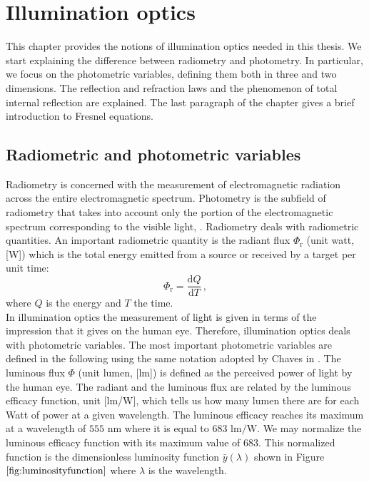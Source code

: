 \chapter{Illumination optics}
This chapter provides the notions of illumination optics needed in this thesis. We start explaining the difference between radiometry and photometry.
In particular, we focus on the photometric variables, defining them both in three and two dimensions. The reflection and refraction laws and the phenomenon of total internal reflection are explained. The last paragraph of the chapter gives a brief introduction to Fresnel equations. 
\section{Radiometric and photometric variables}
Radiometry is concerned with the measurement of electromagnetic radiation across the entire electromagnetic spectrum. Photometry is the subfield of radiometry that takes into account only the portion of the electromagnetic spectrum corresponding to the visible light, \cite{zalewski1995radiometry}. Radiometry deals with radiometric quantities. An important radiometric quantity  is the radiant flux $\Phi_{\textrm{r}}$ (unit watt, [\textrm{W}]) which is the total energy emitted from a source or received by a target per unit time:
\begin{equation}
\Phi_{\textrm{r}} = \frac{\textrm{d}Q}{\textrm{d}T}\,,
\end{equation}
where $Q$ is the energy and $T$ the time.\\
\indent In illumination optics the measurement of light is given in terms of the impression that it gives on the human eye. Therefore, illumination optics deals with photometric variables. The most important photometric variables are defined in the following using the same notation adopted by Chaves in \cite{chaves2015introduction}. The luminous flux $\Phi$ (unit lumen, [\textrm{lm}]) is defined as the perceived power of light by the human eye.
 The radiant and the luminous flux are related by the luminous efficacy function, unit [lm/W], which tells us how many lumen there are for each Watt of power at a given wavelength.
 The luminous efficacy reaches its maximum  at a wavelength of $555$ $\textrm{nm}$ where it is equal to $683$ $\textrm{lm}/\textrm{W}$.
  We may normalize the luminous efficacy function with its maximum value of $683$.
  This normalized function is the dimensionless luminosity function $\bar{y}(\lambda)$ shown in Figure $\ref{fig:luminosityfunction}$ where $\lambda$ is the wavelength.
